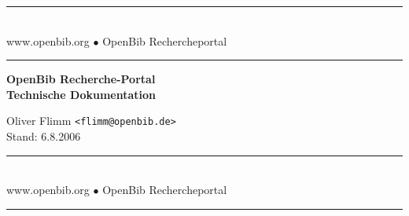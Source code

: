 \documentclass[11pt, twoside, a4paper, BCOR8mm, DIV12, bibtotoc,idxtotoc]{scrbook}
\begin{document}
\frontmatter

\begin{titlepage}

\begin{center}
\rule[-.1in]{16cm}{1mm}\\[3mm]
{\fontsize{20}{20pt}\selectfont
  www.openbib.org $\bullet$ OpenBib Rechercheportal}\\[-2mm]
\rule[-.1in]{16cm}{1mm}

\vspace{5cm}

  \textbf{\fontsize{30}{30pt}\selectfont OpenBib Recherche-Portal\\[3mm] Technische Dokumentation}

  \vspace{2cm}

  Oliver Flimm \texttt{<flimm@openbib.de>}\\
  Stand: 6.8.2006

  \vspace{8cm}

\rule[-.1in]{16cm}{1mm}\\[3mm]
{\fontsize{20}{20pt}\selectfont
  www.openbib.org $\bullet$ OpenBib Rechercheportal}\\[-2mm]
\rule[-.1in]{16cm}{1mm}

\end{center}

\end{titlepage}






\tableofcontents
\end{document}
